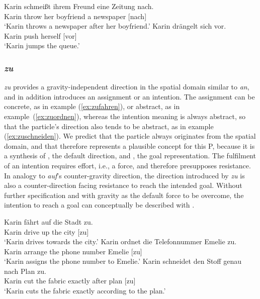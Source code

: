 \documentclass[output=paper]{langsci/langscibook}
\begin{document}
\ea\label{ex:nachschmeissen}
\gll Karin schmeißt ihrem Freund eine Zeitung nach.\\
Karin throw her boyfriend a newspaper [nach]\\
\glt `Karin throws a newspaper after her boyfriend.' 
\ex \label{ex:vordraengeln}
\gll Karin drängelt sich vor.\\
Karin push herself [vor]\\
\glt `Karin jumps the queue.'
\z


\subsubsection{\textit{zu}}

\textit{zu} provides a gravity-independent direction in the spatial
domain similar to \textit{an}, and in addition introduces an
assignment or an intention. The assignment can be concrete, as in
example (\ref{ex:zufahren}), or abstract, as in
example~(\ref{ex:zuordnen}), whereas the intention meaning is always
abstract, so that the particle's direction also tends to be abstract,
as in example (\ref{ex:zuschneiden}). We predict that the particle
always originates from the spatial domain, and that
 therefore represents a plausible concept for
this P, because it is a synthesis of , the default
direction, and , the goal representation. The
fulfilment of an intention requires effort, i.e., a force, and
therefore presupposes resistance. In analogy to \textit{auf}'s
counter-gravity direction, the direction introduced by \textit{zu} is
also a counter-direction facing resistance to reach the intended
goal. Without further specification and with gravity as the default
force to be overcome, the intention to reach a goal can conceptually
be described with .

\ea\label{ex:zufahren}
\gll Karin fährt auf die Stadt zu.\\
Karin drive up the city [zu]\\
\glt `Karin drives towards the city.'
\ex \label{ex:zuordnen}
\gll Karin ordnet die Telefonnummer Emelie zu.\\
Karin arrange the {phone number} Emelie [zu]\\
\glt `Karin assigns the phone number to Emelie.'
\ex \label{ex:zuschneiden}
\gll Karin schneidet den Stoff genau nach Plan zu.\\
Karin cut the fabric exactly after plan [zu]\\
\glt `Karin cuts the fabric exactly according to the plan.'
\z
\end{document}
